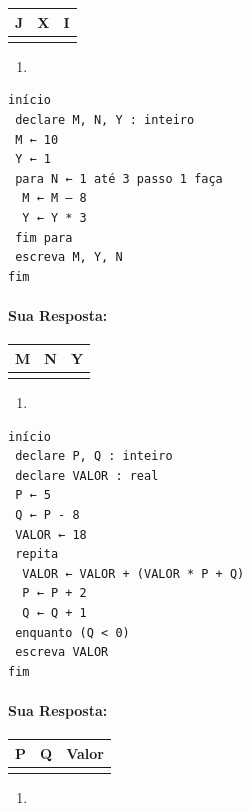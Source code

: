 \documentclass[12pt,a4paper]{article}
\begin{document}
\begin{longtable}[]{@{}ccc@{}}
\toprule
J & X & I\tabularnewline
\midrule
\endhead
& &\tabularnewline
\bottomrule
\end{longtable}

    \begin{enumerate}
\def\labelenumi{\alph{enumi})}
\setcounter{enumi}{3}
\item
\end{enumerate}

\begin{verbatim}
início
 declare M, N, Y : inteiro
 M ← 10
 Y ← 1
 para N ← 1 até 3 passo 1 faça
  M ← M – 8
  Y ← Y * 3
 fim para
 escreva M, Y, N
fim
\end{verbatim}

    \hypertarget{sua-resposta}{%
\paragraph{Sua Resposta:}\label{sua-resposta}}

\begin{longtable}[]{@{}ccc@{}}
\toprule
M & N & Y\tabularnewline
\midrule
\endhead
& &\tabularnewline
\bottomrule
\end{longtable}

    \begin{enumerate}
\def\labelenumi{\alph{enumi})}
\setcounter{enumi}{4}
\item
\end{enumerate}

\begin{verbatim}
início
 declare P, Q : inteiro
 declare VALOR : real
 P ← 5
 Q ← P - 8
 VALOR ← 18
 repita
  VALOR ← VALOR + (VALOR * P + Q)
  P ← P + 2
  Q ← Q + 1
 enquanto (Q < 0)
 escreva VALOR
fim
\end{verbatim}

    \hypertarget{sua-resposta}{%
\paragraph{Sua Resposta:}\label{sua-resposta}}

\begin{longtable}[]{@{}ccc@{}}
\toprule
P & Q & Valor\tabularnewline
\midrule
\endhead
& &\tabularnewline
\bottomrule
\end{longtable}

    \begin{enumerate}
\def\labelenumi{\alph{enumi})}
\setcounter{enumi}{5}
\item
\end{enumerate}
\end{document}
